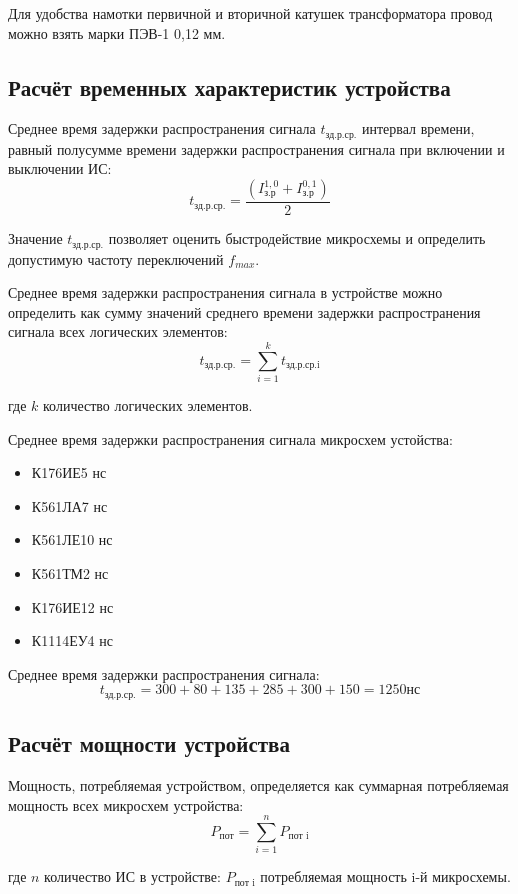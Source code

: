Для удобства намотки первичной и вторичной катушек трансформатора провод можно взять марки ПЭВ-1 0,12 мм.

\subsection*{Расчёт временных характеристик устройства}

Среднее время задержки распространения сигнала $t_\text{зд.р.ср.}$ \longndash интервал времени, равный полусумме времени задержки распространения сигнала при включении и выключении ИС:
\[t_\text{зд.р.ср.}=\frac{(I^{1,0}_\text{з.р}+I^{0,1}_\text{з.р})}{2}\]

Значение $t_\text{зд.р.ср.}$ позволяет оценить быстродействие микросхемы и определить допустимую частоту переключений $f_{max}$.

Среднее время задержки распространения сигнала в устройстве можно определить как сумму значений среднего времени задержки распространения сигнала всех логических элементов:
\[t_\text{зд.р.ср.}=\sum\limits_{i=1}^k t_\text{зд.р.ср.i}\]

где $k$ \longndash количество логических элементов.

Среднее время задержки распространения сигнала микросхем устойства:
\begin{itemize}
	\item К176ИЕ5  нс
	\item К561ЛА7  нс
	\item К561ЛЕ10  нс
	\item К561ТМ2  нс
	\item К176ИЕ12  нс
	\item К1114ЕУ4  нс
\end{itemize}

Среднее время задержки распространения сигнала:
\[t_\text{зд.р.ср.}=300+80+135+285+300+150=1250 \text{нс}\]

\subsection*{Расчёт мощности устройства}

Мощность, потребляемая устройством, определяется как суммарная потребляемая мощность всех микросхем устройства:
\[P_\text{пот}=\sum\limits_{i=1}^n P_\text{пот~i}\]

где $n$ \longndash количество ИС в устройстве:
$P_\text{пот~i}$ \longndash потребляемая мощность i-й микросхемы.

